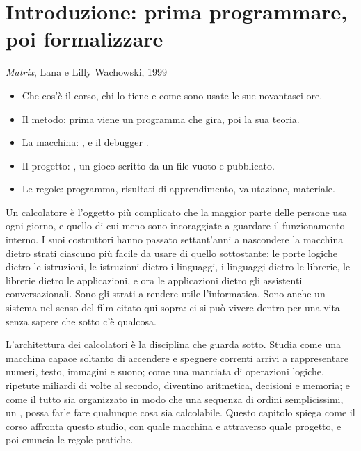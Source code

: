 \chapter{Introduzione: prima programmare, poi formalizzare}
\label{ch:intro}

  {\emph{Matrix}, Lana e Lilly Wachowski, 1999}

\begin{chapgoals}
\begin{itemize}
\item Che cos'è il corso, chi lo tiene e come sono usate le sue novantasei ore.
\item Il metodo: prima viene un programma che gira, poi la sua teoria.
\item La macchina: \prg, \riscv e il debugger \prgqt.
\item Il progetto: \vermone, un gioco scritto da un file vuoto e pubblicato.
\item Le regole: programma, risultati di apprendimento, valutazione, materiale.
\end{itemize}
\end{chapgoals}


Un calcolatore è l'oggetto più complicato che la maggior parte delle persone
usa ogni giorno, e quello di cui meno sono incoraggiate a guardare il
funzionamento interno. I suoi costruttori hanno passato settant'anni a
nascondere la macchina dietro strati ciascuno più facile da usare di quello
sottostante: le porte logiche dietro le istruzioni, le istruzioni dietro i
linguaggi, i linguaggi dietro le librerie, le librerie dietro le applicazioni,
e ora le applicazioni dietro gli assistenti conversazionali. Sono gli strati a
rendere utile l'informatica. Sono anche un sistema nel senso del film citato
qui sopra: ci si può vivere dentro per una vita senza sapere che sotto c'è
qualcosa.

L'architettura dei calcolatori è la disciplina che guarda sotto. Studia come
una macchina capace soltanto di accendere e spegnere correnti arrivi a
rappresentare numeri, testo, immagini e suono; come una manciata di operazioni
logiche, ripetute miliardi di volte al secondo, diventino aritmetica, decisioni
e memoria; e come il tutto sia organizzato in modo che una sequenza di ordini
semplicissimi, un , possa farle fare qualunque cosa sia
calcolabile. Questo capitolo spiega come il corso affronta questo studio, con
quale macchina e attraverso quale progetto, e poi enuncia le regole pratiche.

